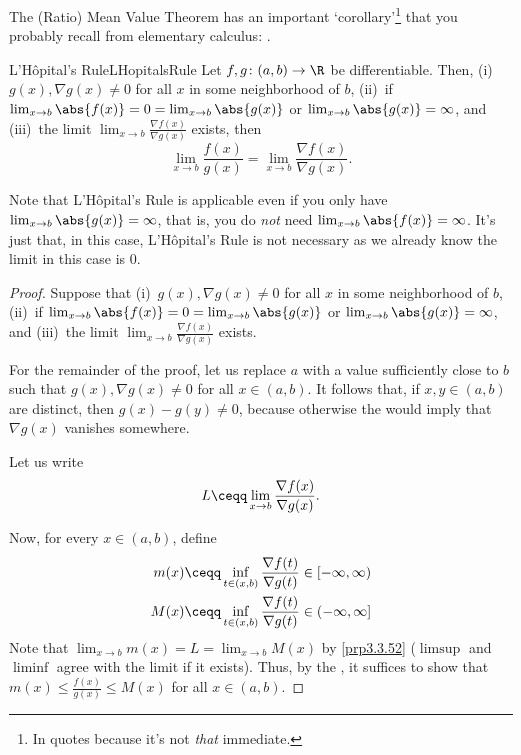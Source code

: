 The (Ratio) Mean Value Theorem has an important `corollary'\footnote{In quotes because it's not \emph{that} immediate.} that you probably recall from elementary calculus:  .
\begin{thm}{L'Hôpital's Rule}{LHopitalsRule}
Let $f,g\colon (a,b)\rightarrow \R$ be differentiable.  Then, (i)~$g(x),\nabla g(x)\neq 0$ for all $x$ in some neighborhood of $b$, (ii)~if $\lim _{x\to b}\abs{f(x)}=0=\lim _{x\to b}\abs{g(x)}$ or $\lim _{x\to b}\abs{g(x)}=\infty$, and (iii)~the limit $\lim _{x\to b}\frac{\nabla f(x)}{\nabla g(x)}$ exists, then
\begin{equation}
\lim _{x\to b}\frac{f(x)}{g(x)}=\lim _{x\to b}\frac{\nabla f(x)}{\nabla g(x)}.
\end{equation}
\begin{rmk}
Note that L'Hôpital's Rule is applicable even if you only have $\lim _{x\to b}\abs{g(x)}=\infty$, that is, you do \emph{not} need $\lim _{x\to b}\abs{f(x)}=\infty$.  It's just that, in this case, L'Hôpital's Rule is not necessary as we already know the limit in this case is $0$.
\end{rmk}
\begin{proof}
Suppose that (i)~$g(x),\nabla g(x)\neq 0$ for all $x$ in some neighborhood of $b$, (ii)~if $\lim _{x\to b}\abs{f(x)}=0=\lim _{x\to b}\abs{g(x)}$ or $\lim _{x\to b}\abs{g(x)}=\infty$, and (iii)~the limit $\lim _{x\to b}\frac{\nabla f(x)}{\nabla g(x)}$ exists.

For the remainder of the proof, let us replace $a$ with a value sufficiently close to $b$ such that $g(x),\nabla g(x)\neq 0$ for all $x\in (a,b)$.  It follows that, if $x,y\in (a,b)$ are distinct, then $g(x)-g(y)\neq 0$, because otherwise the  would imply that $\nabla g(x)$ vanishes somewhere.

Let us write
\begin{equation}
L\ceqq \lim _{x\to b}\frac{\nabla f(x)}{\nabla g(x)}.
\end{equation}

Now, for every $x\in (a,b)$, define
\begin{align}
m(x) & \ceqq \inf _{t\in (x,b)}\frac{\nabla f(t)}{\nabla g(t)}\in [-\infty ,\infty ) \\
M(x) & \ceqq \inf _{t\in (x,b)}\frac{\nabla f(t)}{\nabla g(t)}\in (-\infty ,\infty ]
\end{align}
Note that $\lim _{x\to b}m(x)=L=\lim _{x\to b}M(x)$ by \cref{prp3.3.52} ($\limsup$ and $\liminf$ agree with the limit if it exists).  Thus, by the , it suffices to show that $m(x)\leq \frac{f(x)}{g(x)}\leq M(x)$ for all $x\in (a,b)$.


\end{proof}
\end{thm}
